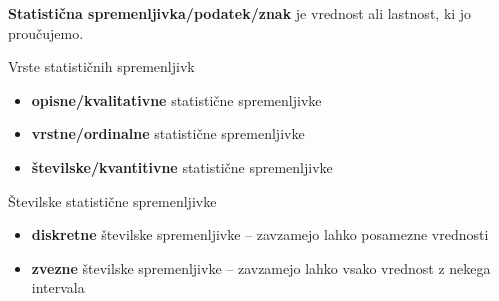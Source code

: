         \begin{frame}
            \begin{alertblock}{}
                \textbf{Statistična spremenljivka/podatek/znak} je vrednost ali lastnost, ki jo proučujemo.
            \end{alertblock}

            \begin{alertblock}{Vrste statističnih spremenljivk}
                \begin{itemize}
                    \item \textbf{opisne/kvalitativne} statistične spremenljivke
                    \item \textbf{vrstne/ordinalne} statistične spremenljivke
                    \item \textbf{številske/kvantitivne} statistične spremenljivke
                \end{itemize}
                
            \end{alertblock}

            \begin{block}{Številske statistične spremenljivke}
                \begin{itemize}
                    \item \textbf{diskretne} številske spremenljivke -- zavzamejo lahko posamezne vrednosti
                    \item \textbf{zvezne} številske spremenljivke -- zavzamejo lahko vsako vrednost z nekega intervala
                \end{itemize}

            \end{block}


        \end{frame}



